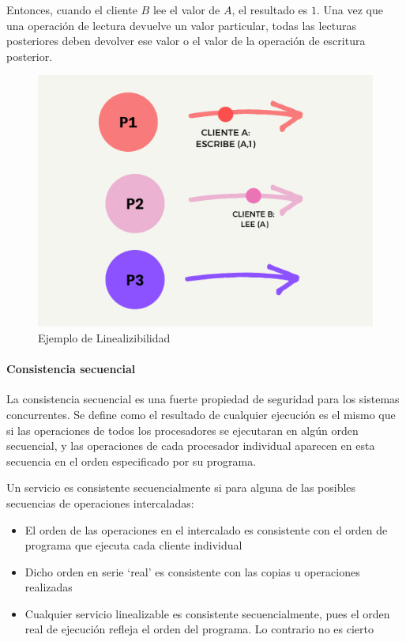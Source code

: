  Entonces, cuando el cliente $B$ lee el valor de $A$, el resultado es $1$. Una vez que una operación de lectura devuelve un valor particular, todas las lecturas posteriores deben devolver ese valor o el valor de la operación de escritura posterior.
 
 
 \begin{figure}%
 	\includegraphics {9/1.png } 
 	\caption{Ejemplo de Linealizibilidad}
 	\label{fig:ejm-lin}
 \end{figure}
 

 \paragraph{ Consistencia secuencial} 
 
 La consistencia secuencial es una fuerte propiedad de seguridad para los sistemas concurrentes.  Se define  como el resultado de cualquier ejecución es el mismo que si las operaciones de todos los procesadores se ejecutaran en algún orden secuencial, y las operaciones de cada procesador individual aparecen en esta secuencia en el orden especificado por su programa.
 
 
 Un servicio es consistente secuencialmente si para alguna
 de las posibles secuencias de operaciones intercaladas:
 \begin{itemize}
 	\item El orden de las operaciones en el intercalado es consistente con
 	el orden de programa que ejecuta cada cliente individual
 	 \item Dicho orden en serie ‘real’ es consistente con las copias u
 	operaciones realizadas
 	 \item Cualquier servicio linealizable es consistente
 	secuencialmente, pues el orden real de ejecución refleja el
 	orden del programa.  Lo contrario no es cierto 
 \end{itemize}
 
